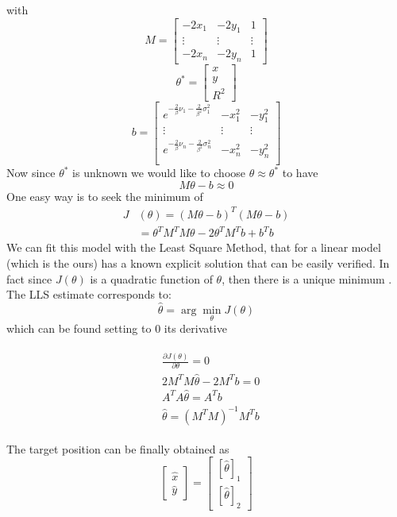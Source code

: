 \documentclass[12pt,twoside]{report}
\begin{document}
with $$M=\begin{bmatrix}
        -2x_1 & -2y_1 & 1\\
        \vdots&\vdots&\vdots\\
        -2x_n & -2y_n & 1
    \end{bmatrix}$$
$$\theta^* =     \begin{bmatrix}
        x\\
        y\\
        R^2
    \end{bmatrix}$$
$$b=    \begin{bmatrix}
        e^{-\frac{2}{\beta}\nu_1-\frac{2}{\beta^2}\sigma^2_1} & -x_1^2 & -y_1^2\\
        \vdots&\vdots&\vdots\\
        e^{-\frac{2}{\beta}\nu_n-\frac{2}{\beta^2}\sigma^2_n} & -x_n^2 & -y_n^2\\
    \end{bmatrix}$$
Now since $\theta^*$ is unknown we would like to choose $\theta\approx\theta^*$ to have 
\begin{equation}
    M\theta-b\approx0
\end{equation}
One easy way is to seek the minimum of 
\begin{align}
    J&(\theta)=(M\theta - b)^T(M\theta - b)\\
    &=\theta^TM^TM\theta-2\theta^TM^Tb+b^Tb
\end{align}
We can fit this model with the Least Square Method, that for a linear model (which is the ours) has a known explicit solution \cite{10.5555/1557273} that can be easily verified. In fact since $J(\theta)$ is a quadratic function of $\theta$, then there is a unique minimum \cite{Ortega1987,rzk}. The LLS estimate corresponds to:
\begin{equation}
    \hat{\theta}=\arg \min_\theta J(\theta)
\end{equation}
which can be found setting to $0$ its derivative
    
\begin{align}
\begin{split}
&\frac{\partial J(\theta)}{\partial \theta}=0\\
    &2M^TM\hat{\theta}-2M^Tb=0\\
    &A^TA\hat{\theta}=A^Tb\\
    &\hat{\theta}=(M^TM)^{-1}M^Tb
\end{split}
\end{align}


The target position can be finally obtained as 
\begin{equation}
\begin{bmatrix}
    \hat{x}\\
    \hat{y}
\end{bmatrix}=
\begin{bmatrix}
    [\hat{\theta}]_1\\
    [\hat{\theta}]_2
\end{bmatrix}
\end{equation}
\clearpage
\end{document}
